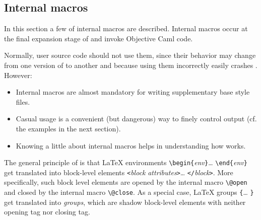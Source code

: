 \subsection{Internal \label{internal}macros}
In this section a few of \hevea{} internal macros are
described.
Internal macros occur at the final expansion stage of \hevea{} and
invoke Objective Caml code.

Normally, user source code should not use them, since
their behavior may change from one version of \hevea{} to another and
because using them incorrectly easily
crashes \hevea.
However:
\begin{itemize}
\item Internal macros
are almost mandatory for writing supplementary base style files.
\item Casual usage is a convenient (but dangerous) way to finely control
output (cf. the examples in the next section).
\item Knowing a little about internal macros helps in understanding how
\hevea{} works.
\end{itemize}


The general principle of \hevea{} is that \LaTeX{} environments
\verb+\begin{+\textit{env}\verb+}+\ldots{}
\verb+\end{+\textit{env}\verb+}+ get
translated into \html{} block-level elements \verb+<+\textit{block}
\textit{attributes}\verb+>+\ldots{} \verb+</+\textit{block}\verb+>+.
More specifically, such block level elements are opened by the
internal macro \verb+\@open+ and closed by the internal macro
\verb+\@close+.
As a special case, \LaTeX{} groups \verb+{+\ldots{} \verb+}+
get translated into \html{} \emph{groups}, which are shadow block-level
elements with neither opening tag nor closing tag.

